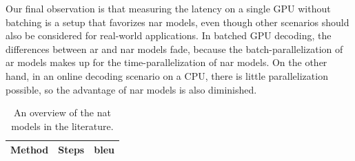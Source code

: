 

Our final observation is that measuring the latency on a single GPU without
batching is a setup that favorizes \ac{nar} models, even though other scenarios
should also be considered for real-world applications. In batched GPU decoding,
the differences between \ac{ar} and \ac{nar} models fade, because the
batch-parallelization of \ac{ar} models makes up for the time-parallelization
of \ac{nar} models. On the other hand, in an online decoding scenario on a CPU,
there is little parallelization possible, so the advantage of \ac{nar} models
is also diminished.




\begin{table}
  \centering

  \begin{tabular}{lll}
    \toprule
    Method & Steps & \acs{bleu} \\
    \midrule

    \bottomrule
  \end{tabular}

  \caption{An overview of the \ac{nat} models in the literature.}%
  \label{tab:related-models}
\end{table}

